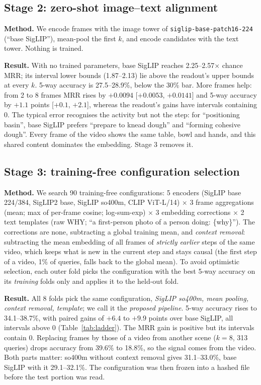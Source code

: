 \documentclass[conference,a4paper]{IEEEtran}
\begin{document}
\subsection{Stage 2: zero-shot image--text alignment}
\textbf{Method.} We encode frames with the image tower of \texttt{siglip-base-patch16-224}~\cite{zhai2023siglip} (``base SigLIP''), mean-pool the first $k$, and encode candidates with the text tower. Nothing is trained.

\textbf{Result.} With no trained parameters, base SigLIP reaches 2.25--2.57$\times$ chance MRR; its interval lower bounds (1.87--2.13) lie above the readout's upper bounds at every $k$. 5-way accuracy is 27.5--28.9\%, below the 30\% bar. More frames help: from 2 to 8 frames MRR rises by $+0.0094$ [$+0.0053$, $+0.0141$] and 5-way accuracy by $+1.1$ points [$+0.1$, $+2.1$], whereas the readout's gains have intervals containing 0. The typical error recognises the activity but not the step: for ``positioning basin'', base SigLIP prefers ``prepare to knead dough'' and ``forming cohesive dough''. Every frame of the video shows the same table, bowl and hands, and this shared content dominates the embedding. Stage 3 removes it.

\subsection{Stage 3: training-free configuration selection}
\textbf{Method.} We search 90 training-free configurations: 5 encoders (SigLIP base 224/384, SigLIP2 base, SigLIP so400m, CLIP ViT-L/14) $\times$ 3 frame aggregations (mean; max of per-frame cosine; log-sum-exp) $\times$ 3 embedding corrections $\times$ 2 text templates (raw WHY; ``a first-person photo of a person doing: \{why\}''). The corrections are none, subtracting a global training mean, and \emph{context removal}: subtracting the mean embedding of all frames of \emph{strictly earlier} steps of the same video, which keeps what is new in the current step and stays causal (the first step of a video, 1\% of queries, falls back to the global mean). To avoid optimistic selection, each outer fold picks the configuration with the best 5-way accuracy on its \emph{training} folds only and applies it to the held-out fold.

\textbf{Result.} All 8 folds pick the same configuration, \emph{SigLIP so400m, mean pooling, context removal, template}; we call it the \emph{proposed pipeline}. 5-way accuracy rises to 34.1--38.7\%, with paired gains of $+6.4$ to $+9.9$ points over base SigLIP, all intervals above 0 (Table~\ref{tab:ladder}). The MRR gain is positive but its intervals contain 0. Replacing frames by those of a video from another scene ($k=8$, 313 queries) drops accuracy from 39.6\% to 18.8\%, so the signal comes from the video. Both parts matter: so400m without context removal gives 31.1--33.0\%, base SigLIP with it 29.1--32.1\%. The configuration was then frozen into a hashed file before the test portion was read.
\end{document}
